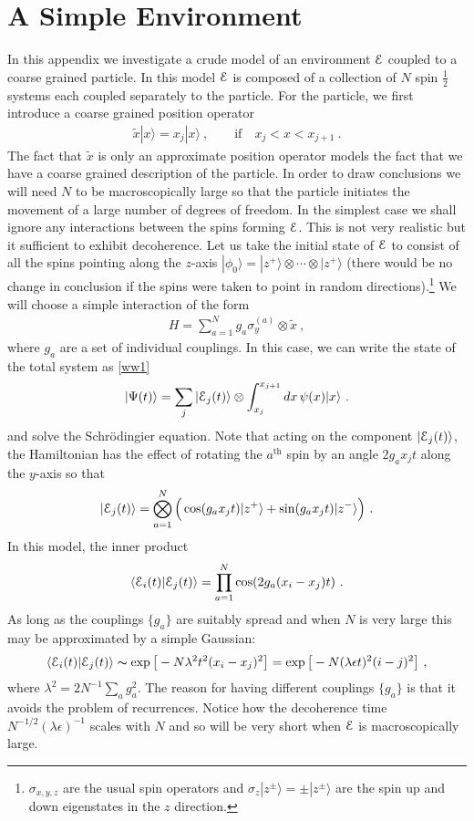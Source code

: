 \documentclass[12pt]{article}
\def\BE{{\EuScript E}}
\def\ket#1{| #1\rangle}
\newcommand{\EQ}[1]{\begin{equation}\begin{split} #1
\end{split}\end{equation}}
\begin{document}
\section{A Simple Environment}\label{a3}

In this appendix we investigate a crude model of an environment $\BE$ coupled to a 
coarse grained particle. In this model
$\BE$ is composed of a collection of $N$ spin $\frac12$ systems each coupled separately to the particle. For the particle, we first introduce a coarse grained position operator
\EQ{
\tilde x\ket{x}=x_j\ket{x}\ ,\qquad\text{if}\quad x_j<x<x_{j+1}\ .
}
The fact that $\tilde x$ is only an approximate position operator models the fact that we have a coarse grained description of the particle.
In order to draw conclusions we will need $N$ to be macroscopically large so that the particle initiates the movement of a large number of degrees of freedom. 
In the simplest case we shall ignore any interactions between the spins forming $\BE$. This is not very realistic but it sufficient to exhibit decoherence. Let us take the initial state of $\BE$ to consist of all the spins pointing along the $z$-axis $\ket{\phi_0}=\ket{z^+}\otimes\cdots\otimes\ket{z^+}$ (there would be no change in conclusion if the spins were taken to point in random directions).\footnote{$\sigma_{x,y,z}$ are the usual spin operators and $\sigma_z\ket{z^\pm}=\pm\ket{z^\pm}$ are the spin up and down eigenstates in the $z$ direction.} We will choose a simple interaction of the form
\EQ{
H=\sum_{a=1}^Ng_a\sigma_y^{(a)}\otimes\tilde x\ ,
}
where $g_a$ are a set of individual couplings. In this case, we can write the state of the total system as \eqref{ww1}
\EQ{
\ket{\Psi(t)}=\sum_j\ket{\BE_j(t)}\otimes\int_{x_j}^{x_{j+1}} dx\,\psi(x)\ket{x}\ .
}
and solve the Schr\"odingier equation. Note that acting on the component $\ket{\BE_j(t)}$, the Hamiltonian has the effect of 
rotating the $a^\text{th}$ spin by an angle $2g_a x_jt$ along the $y$-axis so that 
\EQ{
\ket{\BE_j(t)}=\bigotimes_{a=1}^N\Big(\cos(g_ax_jt)\ket{z^+}+\sin(g_ax_jt)\ket{z^-}\Big)\ .
}
In this model, the inner product
\EQ{
\langle\BE_i(t)\ket{\BE_j(t)}=\prod_{a=1}^N\cos(2g_a(x_i-x_j)t)\ .
}
As long as the couplings $\{g_a\}$ are suitably spread and when $N$ is very large this may be approximated by a simple Gaussian: 
\EQ{
\langle\BE_i(t)\ket{\BE_j(t)}\thicksim \exp\big[-N\lambda^2t^2(x_i-x_j)^2\big]=\exp\big[-N(\lambda\epsilon t)^2(i-j)^2\big]\ ,
}
where $\lambda^2=2N^{-1}\sum_ag_a^2$. The reason for having different couplings $\{g_a\}$ is that it avoids the problem of recurrences. Notice how the decoherence time $N^{-1/2}(\lambda\epsilon)^{-1}$ scales with $N$ and so will be very short when $\BE$ is macroscopically large. 
\end{document}
